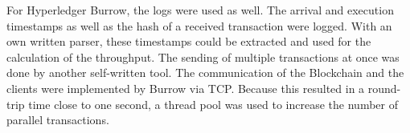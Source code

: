 For Hyperledger Burrow, the logs were used as well. The arrival and execution timestamps as well as the hash of a 
received transaction were logged. With an own written parser, these timestamps could be extracted and used for the calculation
of the throughput. The sending of multiple transactions at once was done by another self-written tool. The communication of the
Blockchain and the clients were implemented by Burrow via TCP. Because this resulted in a round-trip time close to one second, a thread pool
was used to increase the number of parallel transactions. 